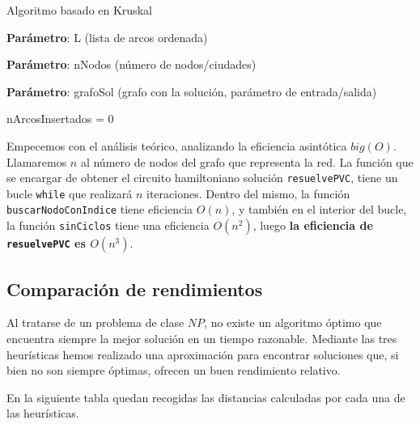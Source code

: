 \begin{algorithm}
	\caption{Algoritmo basado en Kruskal}\label{alg:bas_kruscal}
	\begin{minipage}{0.92\textwidth}
		\textbf{Parámetro}: L (lista de arcos ordenada)
		
		\textbf{Parámetro}: nNodos (número de nodos/ciudades)
		
		\textbf{Parámetro}: grafoSol (grafo con la solución, parámetro de entrada/salida)
	\end{minipage}
	nArcosInsertados = 0\;
\end{algorithm}




Empecemos con el análisis teórico, analizando la eficiencia asintótica $big(O)$. Llamaremos $n$ al número 
de nodos del grafo que representa la red. La función que se encargar de obtener el circuito hamiltoniano 
solución \texttt{resuelvePVC}, tiene un bucle \texttt{while} que realizará $n$ iteraciones. Dentro del mismo, 
la función \texttt{buscarNodoConIndice} tiene eficiencia $O(n)$, y también en el interior del bucle, la 
función \texttt{sinCiclos} tiene una eficiencia $O(n^2)$, luego \textbf{la eficiencia de \texttt{resuelvePVC} es $O(n^3)$}.

\subsection{Comparación de rendimientos}

Al tratarse de un problema de clase $NP$, no existe un algoritmo óptimo que encuentra siempre
la mejor solución en un tiempo razonable. Mediante las tres heurísticas hemos realizado una aproximación
para encontrar soluciones que, si bien no son siempre óptimas, ofrecen un buen rendimiento relativo.

En la siguiente tabla quedan recogidas las distancias calculadas por cada una de las heurísticas.

